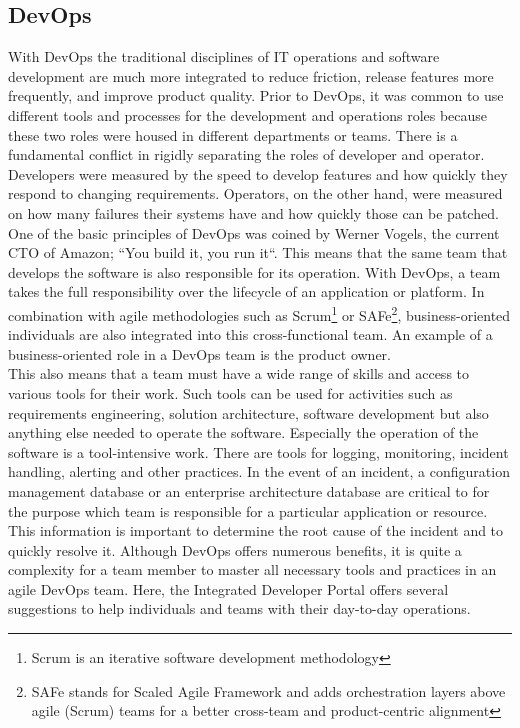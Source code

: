 \documentclass[a4paper,12pt]{article}
\begin{document}
    \subsection{DevOps}
    \label{subsec:devops}
    With DevOps the traditional disciplines of IT operations and software development are much more integrated to
    reduce friction, release features more frequently, and improve product quality\parencite{safedevops}.
    Prior to DevOps, it was common to use different tools and processes for the development and operations roles
    because these two roles were housed in different departments or teams.
    There is a fundamental conflict in rigidly separating the roles of developer and operator.
    Developers were measured by the speed to develop features and how quickly they respond to changing requirements.
    Operators, on the other hand, were measured on how many failures their systems have and how quickly those can be patched.\\
    One of the basic principles of DevOps was coined by Werner Vogels, the current CTO of Amazon;
    ``You build it, you run it``\parencite{vogels}.
    This means that the same team that develops the software is also responsible for its operation.
    With DevOps, a team takes the full responsibility over the lifecycle of an application or platform.
    In combination with agile methodologies such as Scrum\footnote{Scrum is an iterative software development methodology}
    or SAFe\footnote{SAFe stands for Scaled Agile Framework and adds orchestration layers above agile (Scrum) teams for
    a better cross-team and product-centric alignment}, business-oriented individuals are also integrated into this
    cross-functional team.
    An example of a business-oriented role in a DevOps team is the product owner\parencite{safepo}.\\
    This also means that a team must have a wide range of skills and access to various tools for their work.
    Such tools can be used for activities such as requirements engineering, solution architecture, software development
    but also anything else needed to operate the software.
    Especially the operation of the software is a tool-intensive work.
    There are tools for logging, monitoring, incident handling, alerting and other practices.
    In the event of an incident, a configuration management database or an enterprise architecture database are critical
    to for the purpose which team is responsible for a particular application or resource.
    This information is important to determine the root cause of the incident and to quickly resolve it.
    Although DevOps offers numerous benefits, it is quite a complexity for a team member to master all necessary tools and
    practices in an agile DevOps team.
    Here, the Integrated Developer Portal offers several suggestions to help individuals and teams with their day-to-day operations.
\end{document}
